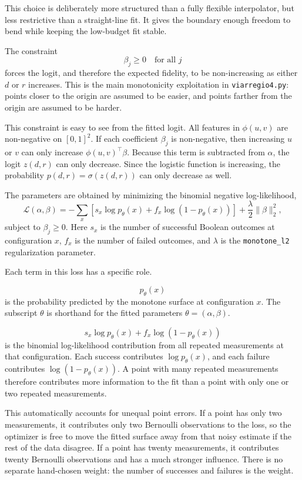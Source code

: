 This choice is deliberately more structured than a fully flexible interpolator,
but less restrictive than a straight-line fit.  It gives the boundary enough
freedom to bend while keeping the low-budget fit stable.

The constraint
\[
    \beta_j \geq 0
    \quad \text{for all } j
\]
forces the logit, and therefore the expected fidelity, to be non-increasing as
either \(d\) or \(r\) increases.  This is the main monotonicity exploitation in
\texttt{viarregio4.py}: points closer to the origin are assumed to be easier,
and points farther from the origin are assumed to be harder.

This constraint is easy to see from the fitted logit.  All features in
\(\phi(u,v)\) are non-negative on \([0,1]^2\).  If each coefficient
\(\beta_j\) is non-negative, then increasing \(u\) or \(v\) can only increase
\(\phi(u,v)^\top\beta\).  Because this term is subtracted from \(\alpha\), the
logit \(z(d,r)\) can only decrease.  Since the logistic function is increasing,
the probability \(p(d,r)=\sigma(z(d,r))\) can only decrease as well.

The parameters are obtained by minimizing the binomial negative log-likelihood,
\[
    \mathcal{L}(\alpha,\beta)
    =
    -\sum_x
    \left[
        s_x \log p_\theta(x)
        +
        f_x\log(1-p_\theta(x))
    \right]
    +
    \frac{\lambda}{2}\|\beta\|_2^2,
\]
subject to \(\beta_j\geq 0\).  Here \(s_x\) is the number of successful Boolean
outcomes at configuration \(x\), \(f_x\) is the number of failed outcomes, and
\(\lambda\) is the \texttt{monotone\_l2} regularization parameter.

Each term in this loss has a specific role.

\[
    p_\theta(x)
\]
is the probability predicted by the monotone surface at configuration \(x\).
The subscript \(\theta\) is shorthand for the fitted parameters
\(\theta=(\alpha,\beta)\).

\[
    s_x \log p_\theta(x)
    +
    f_x\log(1-p_\theta(x))
\]
is the binomial log-likelihood contribution from all repeated measurements at
that configuration.  Each success contributes \(\log p_\theta(x)\), and each
failure contributes \(\log(1-p_\theta(x))\).  A point with many repeated
measurements therefore contributes more information to the fit than a point
with only one or two repeated measurements.

This automatically accounts for unequal point errors.  If a point has only two
measurements, it contributes only two Bernoulli observations to the loss, so the
optimizer is free to move the fitted surface away from that noisy estimate if
the rest of the data disagree.  If a point has twenty measurements, it
contributes twenty Bernoulli observations and has a much stronger influence.
There is no separate hand-chosen weight: the number of successes and failures
is the weight.


